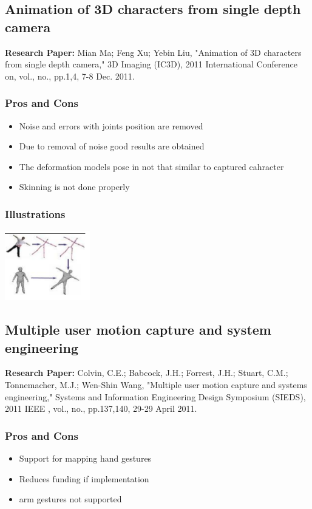 \documentclass[a4paper,10pt]{report}
\begin{document}
\subsection{Animation of 3D characters from single depth camera}
\textbf{Research Paper:} Mian Ma; Feng Xu; Yebin Liu, "Animation of 3D characters from single depth camera," 3D Imaging (IC3D), 2011 International Conference on, vol., no., pp.1,4, 7-8 Dec. 2011.
\subsubsection{Pros and Cons}
\begin{itemize}
 \item Noise and errors with joints position are removed
 \item Due to removal of noise good results are obtained
 \item The deformation models pose in not that similar to captured cahracter
 \item Skinning is not done properly
\end{itemize}
\subsubsection{Illustrations}\newline\newline
\includegraphics{./tech4.png}
\newline\newline


\subsection{Multiple user motion capture and system engineering}
\textbf{Research Paper:} Colvin, C.E.; Babcock, J.H.; Forrest, J.H.; Stuart, C.M.; Tonnemacher, M.J.; Wen-Shin Wang, "Multiple user motion capture and systems engineering," Systems and Information Engineering Design Symposium (SIEDS), 2011 IEEE , vol., no., pp.137,140, 29-29 April 2011.
\subsubsection{Pros and Cons}
\begin{itemize}
 \item Support for mapping hand gestures
 \item Reduces funding if implementation
 \item arm gestures not supported
\end{itemize}
\end{document}
